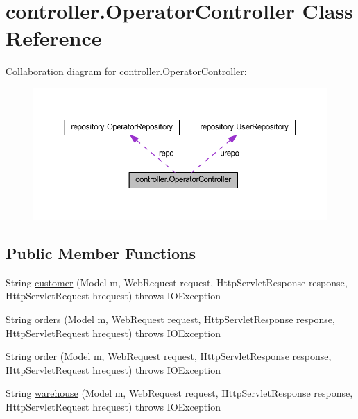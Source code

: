 \hypertarget{classcontroller_1_1_operator_controller}{}\section{controller.\+Operator\+Controller Class Reference}
\label{classcontroller_1_1_operator_controller}


Collaboration diagram for controller.\+Operator\+Controller\+:\nopagebreak
\begin{figure}[H]
\begin{center}
\leavevmode
\includegraphics[width=350pt]{classcontroller_1_1_operator_controller__coll__graph}
\end{center}
\end{figure}
\subsection*{Public Member Functions}
\begin{DoxyCompactItemize}
\item 
String \mbox{\hyperlink{classcontroller_1_1_operator_controller_af4c2983ca84d7115743de160da84135c}{customer}} (Model m, Web\+Request request, Http\+Servlet\+Response response, Http\+Servlet\+Request hrequest)  throws I\+O\+Exception 
\item 
String \mbox{\hyperlink{classcontroller_1_1_operator_controller_a79b22da6d85dc475cd7973d4f9a47fc1}{orders}} (Model m, Web\+Request request, Http\+Servlet\+Response response, Http\+Servlet\+Request hrequest)  throws I\+O\+Exception 
\item 
String \mbox{\hyperlink{classcontroller_1_1_operator_controller_a1fcb7b5bea154a09eef4db21632bcc60}{order}} (Model m, Web\+Request request, Http\+Servlet\+Response response, Http\+Servlet\+Request hrequest)  throws I\+O\+Exception 
\item 
String \mbox{\hyperlink{classcontroller_1_1_operator_controller_ac1739e3ad5746eb50e72a79df2cd7aca}{warehouse}} (Model m, Web\+Request request, Http\+Servlet\+Response response, Http\+Servlet\+Request hrequest)  throws I\+O\+Exception 
\end{DoxyCompactItemize}


